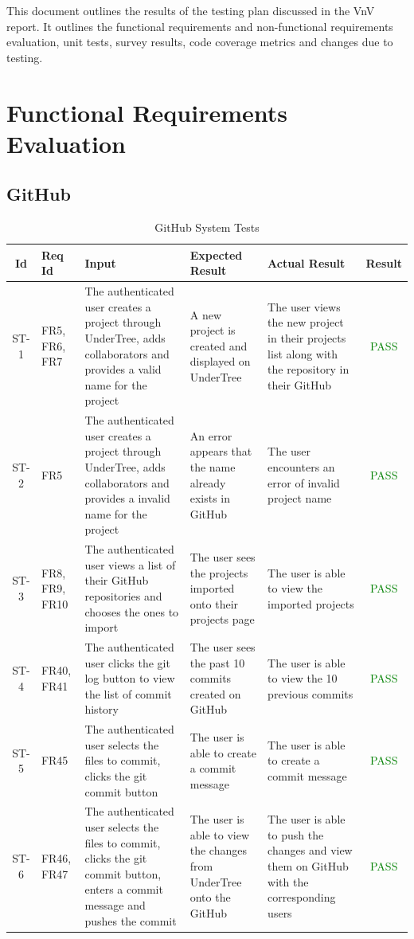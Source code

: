 \documentclass[12pt, titlepage]{article}
\begin{document}
	\newpage
	
	
	This document outlines the results of the testing plan discussed in the VnV report. It outlines the functional requirements and non-functional requirements evaluation, unit tests, survey results, code coverage metrics and changes due to testing.
	
	\section{Functional Requirements Evaluation}
	
	\subsection{GitHub}
	\begin{center}
		\begin{longtable}{|c|p{1cm}|p{2.7cm}|p{3cm}|p{3cm}|c|}
			\caption{GitHub System Tests \label{long}}\\
			\hline
			\textbf{Id} & \textbf{Req Id} & \textbf{Input} & \textbf{Expected Result} & \textbf{Actual Result} & \textbf{Result}   \\
			\hline
			ST-1 & FR5, FR6, FR7 & The authenticated user creates a project through UnderTree, adds collaborators and provides a valid name for the project & A new project is created and displayed on UnderTree & The user views the new project in their projects list along with the repository in their GitHub & \textcolor{green}{PASS} \\
			\hline
			ST-2 & FR5 & The authenticated user creates a project through UnderTree, adds collaborators and provides a invalid name for the project & An error appears that the name already exists in GitHub & The user encounters an error of invalid project name & \textcolor{green}{PASS} \\
			\hline
			ST-3 & FR8, FR9, FR10 & The authenticated user views a list of their GitHub repositories and chooses the ones to import & The user sees the projects imported onto their projects page & The user is able to view the imported projects & \textcolor{green}{PASS} \\
			\hline
			ST-4 & FR40, FR41 & The authenticated user clicks the git log button to view the list of commit history & The user sees the past 10 commits created on GitHub & The user is able to view the 10 previous commits & \textcolor{green}{PASS} \\
			\hline
			ST-5 & FR45 & The authenticated user selects the files to commit, clicks the git commit button & The user is able to create a commit message & The user is able to create a commit message & \textcolor{green}{PASS} \\
			\hline
			ST-6 & FR46, FR47 & The authenticated user selects the files to commit, clicks the git commit button, enters a commit message and pushes the commit & The user is able to view the changes from UnderTree onto the GitHub & The user is able to push the changes and view them on GitHub with the corresponding users & \textcolor{green}{PASS} \\
			\hline
		\end{longtable}
	\end{center}
	
\end{document}
